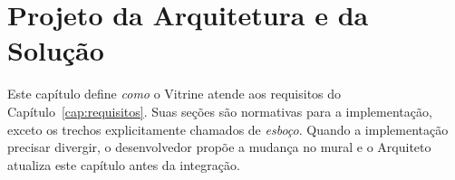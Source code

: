 \chapter{Projeto da Arquitetura e da Solução}\label{cap:arquitetura}

Este capítulo define \emph{como} o Vitrine atende aos requisitos do Capítulo~\ref{cap:requisitos}. Suas seções são normativas para a implementação, exceto os trechos explicitamente chamados de \emph{esboço}. Quando a implementação precisar divergir, o desenvolvedor propõe a mudança no mural e o Arquiteto atualiza este capítulo antes da integração.























